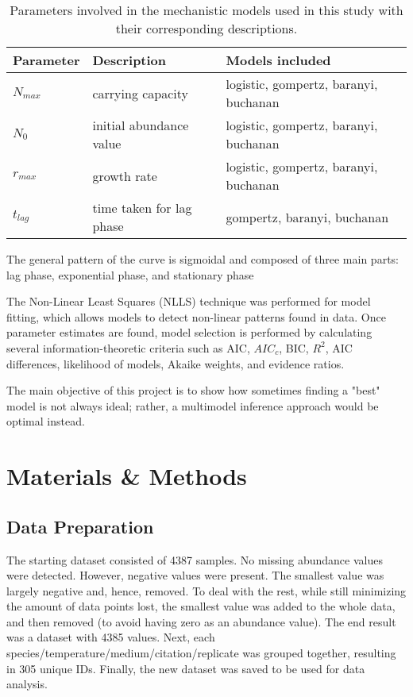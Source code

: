 \documentclass[11pt]{article}
\begin{document}
\begin{linenumbers}
	\begin{table}[ht]
		\centering
		\begin{tabular}{|l|l|l|}
			\hline
			Parameter & Description              & Models included                       \\ \hline\hline
			$N_{max}$ & carrying capacity        & logistic, gompertz, baranyi, buchanan \\ \hline
			$N_0$     & initial abundance value  & logistic, gompertz, baranyi, buchanan \\ \hline
			$r_{max}$ & growth rate              & logistic, gompertz, baranyi, buchanan \\ \hline
			$t_{lag}$ & time taken for lag phase & gompertz, baranyi, buchanan           \\ \hline
		\end{tabular}
		\caption{Parameters involved in the mechanistic models used in this study with their corresponding descriptions.}
		\label{tab:parameters}
	\end{table}

	\par The general pattern of the curve is sigmoidal and composed of three main parts: lag phase, exponential phase, and stationary phase %
	\par The Non-Linear Least Squares (NLLS) technique was performed for model fitting, which allows models to detect non-linear patterns found in data. Once parameter estimates are found, model selection is performed by calculating several information-theoretic criteria such as AIC, $AIC_c$, BIC, $R^2$, AIC differences, likelihood of models, Akaike weights, and evidence ratios.
	\par The main objective of this project is to show how sometimes finding a "best" model is not always ideal; rather, a multimodel inference approach would be optimal instead.

	\section{Materials \& Methods}
	\subsection{Data Preparation}
	The starting dataset consisted of 4387 samples. No missing abundance values were detected. However, negative values were present. The smallest value was largely negative and, hence, removed. To deal with the rest, while still minimizing the amount of data points lost, the smallest value was added to the whole data, and then removed (to avoid having zero as an abundance value). The end result was a dataset with 4385 values.
	Next, each species/temperature/medium/citation/replicate was grouped together, resulting in 305 unique IDs. Finally, the new dataset was saved to be used for data analysis.


\end{linenumbers}
\end{document}
